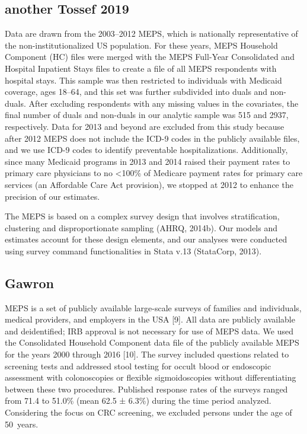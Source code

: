 \documentclass[../main.tex]{subfiles}
\begin{document}
\subsection{ another Tossef 2019}
Data are drawn from the 2003–2012 MEPS, which is nationally representative of the non-institutionalized US population. For these years, MEPS Household Component (HC) files were merged with the MEPS Full-Year Consolidated and Hospital Inpatient Stays files to create a file of all MEPS respondents with hospital stays. This sample was then restricted to individuals with Medicaid coverage, ages 18–64, and this set was further subdivided into duals and non-duals. After excluding respondents with any missing values in the covariates, the final number of duals and non-duals in our analytic sample was 515 and 2937, respectively. Data for 2013 and beyond are excluded from this study because after 2012 MEPS does not include the ICD-9 codes in the publicly available files, and we use ICD-9 codes to identify preventable hospitalizations. Additionally, since many Medicaid programs in 2013 and 2014 raised their payment rates to primary care physicians to no <100\% of Medicare payment rates for primary care services (an Affordable Care Act provision), we stopped at 2012 to enhance the precision of our estimates.

The MEPS is based on a complex survey design that involves stratification, clustering and disproportionate sampling (AHRQ, 2014b). Our models and estimates account for these design elements, and our analyses were conducted using survey command functionalities in Stata v.13 (StataCorp, 2013).



\subsection{Gawron}
MEPS is a set of publicly available large-scale surveys of families and individuals, medical providers, and employers in the USA [9]. All data are publicly available and deidentified; IRB approval is not necessary for use of MEPS data. We used the Consolidated Household Component data file of the publicly available MEPS for the years 2000 through 2016 [10]. The survey included questions related to screening tests and addressed stool testing for occult blood or endoscopic assessment with colonoscopies or flexible sigmoidoscopies without differentiating between these two procedures. Published response rates of the surveys ranged from 71.4 to 51.0\% (mean 62.5 ± 6.3\%) during the time period analyzed. Considering the focus on CRC screening, we excluded persons under the age of 50 years.
\end{document}
